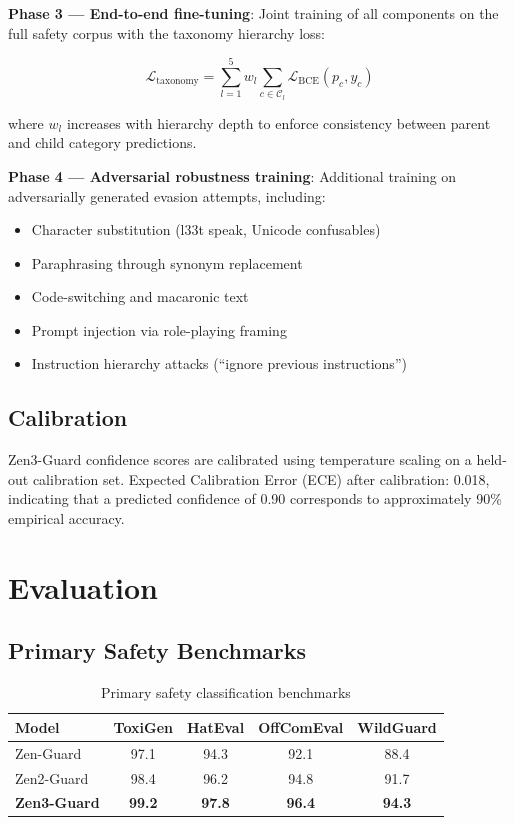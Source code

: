 \documentclass[11pt,a4paper]{article}
\begin{document}
\textbf{Phase 3 --- End-to-end fine-tuning}: Joint training of all components on the
full safety corpus with the taxonomy hierarchy loss:

\begin{equation}
\mathcal{L}_{\text{taxonomy}} = \sum_{l=1}^{5} w_l \sum_{c \in \mathcal{C}_l} \mathcal{L}_{\text{BCE}}(p_c, y_c)
\end{equation}

where $w_l$ increases with hierarchy depth to enforce consistency between parent
and child category predictions.

\textbf{Phase 4 --- Adversarial robustness training}: Additional training on
adversarially generated evasion attempts, including:
\begin{itemize}
\item Character substitution (l33t speak, Unicode confusables)
\item Paraphrasing through synonym replacement
\item Code-switching and macaronic text
\item Prompt injection via role-playing framing
\item Instruction hierarchy attacks (``ignore previous instructions'')
\end{itemize}

\subsection{Calibration}

Zen3-Guard confidence scores are calibrated using temperature scaling on a held-out
calibration set. Expected Calibration Error (ECE) after calibration: 0.018, indicating
that a predicted confidence of 0.90 corresponds to approximately 90\% empirical accuracy.

\section{Evaluation}
\label{sec:eval}

\subsection{Primary Safety Benchmarks}

\begin{table}[H]
\centering
\caption{Primary safety classification benchmarks}
\begin{tabular}{lcccc}
\toprule
\textbf{Model} & \textbf{ToxiGen} & \textbf{HatEval} & \textbf{OffComEval} & \textbf{WildGuard} \\
\midrule
Zen-Guard     & 97.1 & 94.3 & 92.1 & 88.4 \\
Zen2-Guard    & 98.4 & 96.2 & 94.8 & 91.7 \\
\textbf{Zen3-Guard} & \textbf{99.2} & \textbf{97.8} & \textbf{96.4} & \textbf{94.3} \\
\bottomrule
\end{tabular}
\label{tab:safety}
\end{table}
\end{document}
